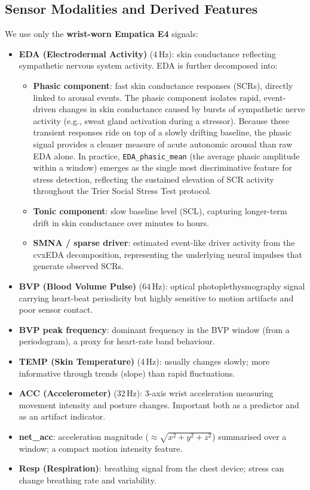 \documentclass[11pt]{article}
\begin{document}
\subsection{Sensor Modalities and Derived Features}
We use only the \textbf{wrist-worn Empatica E4} signals:
\begin{itemize}
    \item \textbf{EDA (Electrodermal Activity)} (4\,Hz): skin conductance reflecting sympathetic nervous system activity. EDA is further decomposed into:
    \begin{itemize}
        \item \textbf{Phasic component}: fast skin conductance responses (SCRs), directly linked to arousal events.
        The phasic component isolates rapid, event-driven changes in skin conductance caused by bursts of sympathetic nerve activity (e.g., sweat gland activation during a stressor).
        Because these transient responses ride on top of a slowly drifting baseline, the phasic signal provides a cleaner measure of acute autonomic arousal than raw EDA alone.
        In practice, \texttt{EDA\_phasic\_mean} (the average phasic amplitude within a window) emerges as the single most discriminative feature for stress detection, reflecting the sustained elevation of SCR activity throughout the Trier Social Stress Test protocol.
        \item \textbf{Tonic component}: slow baseline level (SCL), capturing longer-term drift in skin conductance over minutes to hours.
        \item \textbf{SMNA / sparse driver}: estimated event-like driver activity from the cvxEDA decomposition, representing the underlying neural impulses that generate observed SCRs.
    \end{itemize}
    \item \textbf{BVP (Blood Volume Pulse)} (64\,Hz): optical photoplethysmography signal carrying heart-beat periodicity but highly sensitive to motion artifacts and poor sensor contact.
    \item \textbf{BVP peak frequency}: dominant frequency in the BVP window (from a periodogram), a proxy for heart-rate band behaviour.
    \item \textbf{TEMP (Skin Temperature)} (4\,Hz): usually changes slowly; more informative through trends (slope) than rapid fluctuations.
    \item \textbf{ACC (Accelerometer)} (32\,Hz): 3-axis wrist acceleration measuring movement intensity and posture changes. Important both as a predictor and as an artifact indicator.
    \item \textbf{net\_acc}: acceleration magnitude ($\approx\sqrt{x^2+y^2+z^2}$) summarised over a window; a compact motion intensity feature.
    \item \textbf{Resp (Respiration)}: breathing signal from the chest device; stress can change breathing rate and variability.
\end{itemize}
\end{document}
